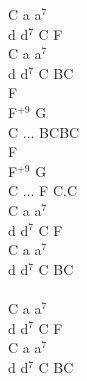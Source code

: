 \documentclass[a5paper, 10pt]{book}
\begin{document}
\begin{minipage}[t]{0.3\textwidth}
C a a$^7$\\
d d$^7$ C F\\
C a a$^7$\\
d d$^7$ C BC\\

F\\
F$^{+9}$ G\\
C ... BCBC\\
F\\
F$^{+9}$ G\\
C ... F C.C\\

C a a$^7$\\
d d$^7$ C F\\
C a a$^7$\\
d d$^7$ C BC\\

~\\

C a a$^7$\\
d d$^7$ C F\\
C a a$^7$\\
d d$^7$ C BC\\

~\\

\end{minipage}

\newpage
\end{document}
